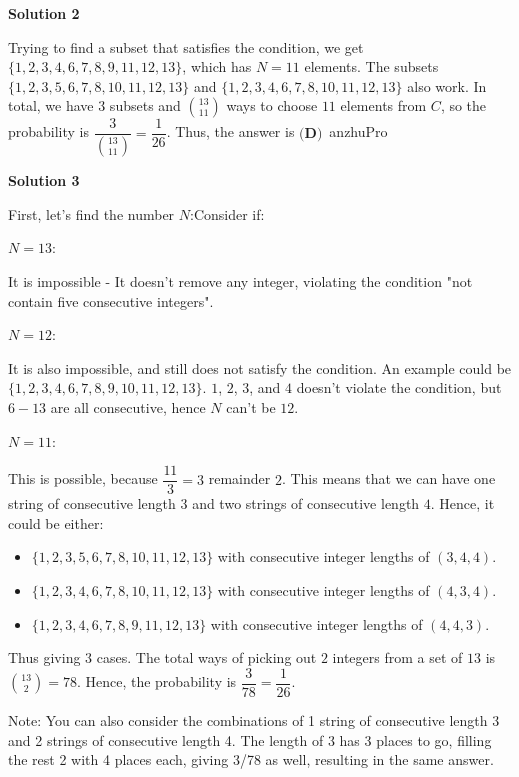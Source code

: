 \begin{enumerate}
 



\textbf{Solution 2}

Trying to find a subset that satisfies the condition, we get $\{1,2,3,4,6,7,8,9,11,12,13\}$, which has $N=11$ elements. The subsets $\{1,2,3,5,6,7,8,10,11,12,13\}$ and $\{1,2,3,4,6,7,8,10,11,12,13\}$ also work. In total, we have $3$ subsets and $\binom{13}{11}$ ways to choose $11$ elements from $C$, so the probability is $\dfrac{3}{\binom{13}{11}} = \dfrac{1}{26}$. Thus, the answer is $\boxed{\textbf{(D)}}$~anzhuPro

 



\textbf{Solution 3}

First, let's find the number $N$:Consider if:

 
$N=13$: 

 It is impossible - It doesn't remove any integer, violating the condition "not contain five consecutive integers".

 
$N=12$:

 It is also impossible, and still does not satisfy the condition. An example could be $\{1,2,3,4,6,7,8,9,10,11,12,13\}$. $1$, $2$, $3$, and $4$ doesn't violate the condition, but $6-13$ are all consecutive, hence $N$ can't be $12$. 

 
$N=11$: 

 This is possible, because $\dfrac{11}{3} = 3$ remainder $2$. This means that we can have one string of consecutive length $3$ and two strings of consecutive length $4$. Hence, it could be either:

 
            \begin{itemize}
        \item $\{1,2,3,5,6,7,8,10,11,12,13\}$ with consecutive integer lengths of $(3, 4, 4)$.
        \item $\{1,2,3,4,6,7,8,10,11,12,13\}$ with consecutive integer lengths of $(4, 3, 4)$.
        \item $\{1,2,3,4,6,7,8,9,11,12,13\}$ with consecutive integer lengths of $(4, 4, 3)$.
            \end{itemize}
            Thus giving $3$ cases. The total ways of picking out $2$ integers from a set of $13$ is $\binom{13}{2} = 78$. Hence, the probability is $\dfrac{3}{78} = \boxed{\dfrac{1}{26}}$.

 
Note: You can also consider the combinations of 1 string of consecutive length 3 and 2 strings of consecutive length 4. The length of 3 has 3 places to go, filling the rest 2 with 4 places each, giving 3/78 as well, resulting in the same answer. 


\end{enumerate}

